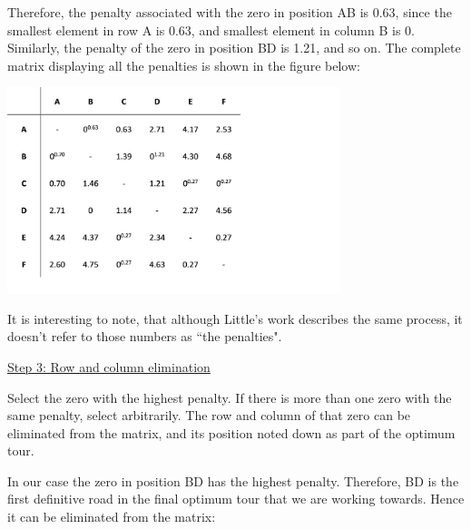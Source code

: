 \vspace{5mm}

Therefore, the penalty associated with the zero in position AB is 0.63, since the smallest element in row A is 0.63, and smallest element in column B is 0. Similarly, the penalty of the zero in position BD is 1.21, and so on. The complete matrix displaying all the penalties is shown in the figure below:	
\vspace{3mm}
	
	\includegraphics[height=6cm]{dmpenalties}
	
It is interesting to note, that although Little’s work describes the same process, it doesn’t refer to those numbers as “the penalties".

\vspace{5mm}

\underline{Step 3: Row and column elimination}
\vspace{1mm}

Select the zero with the highest penalty. If there is more than one zero with the same penalty, select arbitrarily. The row and column of that zero can be eliminated from the matrix, and its position noted down as part of the optimum tour.

\vspace{5mm}

In our case the zero in position BD has the highest penalty. Therefore, BD is the first definitive road in the final optimum tour that we are working towards. Hence it can be eliminated from the matrix:

\vspace{3mm}

